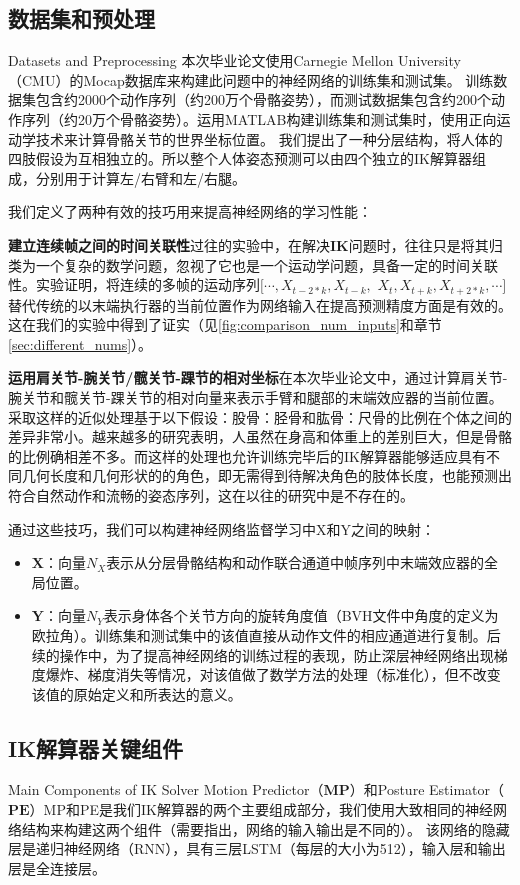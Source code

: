 \subsection{数据集和预处理}{Datasets and Preprocessing}
本次毕业论文使用Carnegie Mellon University（CMU）的Mocap数据库来构建此问题中的神经网络的训练集和测试集。 训练数据集包含约2000个动作序列（约200万个骨骼姿势），而测试数据集包含约200个动作序列（约20万个骨骼姿势）。运用MATLAB构建训练集和测试集时，使用正向运动学技术来计算骨骼关节的世界坐标位置。 我们提出了一种分层结构，将人体的四肢假设为互相独立的。所以整个人体姿态预测可以由四个独立的IK解算器组成，分别用于计算左/右臂和左/右腿。

我们定义了两种有效的技巧用来提高神经网络的学习性能：

\textbf{建立连续帧之间的时间关联性}过往的实验中，在解决\textbf{IK}问题时，往往只是将其归类为一个复杂的数学问题，忽视了它也是一个运动学问题，具备一定的时间关联性。实验证明，将连续的多帧的运动序列$[\cdots, X_{t-2*k}, X_{t-k},$ $ X_{t}, X_{t+k}, X_{t+2*k},\cdots]$替代传统的以末端执行器的当前位置作为网络输入在提高预测精度方面是有效的。 这在我们的实验中得到了证实（见\cref{fig:comparison_num_inputs}和章节\ref{sec:different_nums}）。

\textbf{运用肩关节-腕关节/髋关节-踝节的相对坐标}在本次毕业论文中，通过计算肩关节-腕关节和髋关节-踝关节的相对向量来表示手臂和腿部的末端效应器的当前位置。采取这样的近似处理基于以下假设：股骨：胫骨和肱骨：尺骨的比例在个体之间的差异非常小。越来越多的研究表明，人虽然在身高和体重上的差别巨大，但是骨骼的比例确相差不多。而这样的处理也允许训练完毕后的IK解算器能够适应具有不同几何长度和几何形状的的角色，即无需得到待解决角色的肢体长度，也能预测出符合自然动作和流畅的姿态序列，这在以往的研究中是不存在的。

通过这些技巧，我们可以构建神经网络监督学习中\*X和\*Y之间的映射：

\begin{itemize}
\item $\mathbf{X}$：向量$N_X$表示从分层骨骼结构和动作联合通道中帧序列中末端效应器的全局位置。
\item $\mathbf{Y}$：向量$N_Y$表示身体各个关节方向的旋转角度值（BVH文件中角度的定义为欧拉角）。训练集和测试集中的该值直接从动作文件的相应通道进行复制。后续的操作中，为了提高神经网络的训练过程的表现，防止深层神经网络出现梯度爆炸、梯度消失等情况，对该值做了数学方法的处理（标准化），但不改变该值的原始定义和所表达的意义。
\end{itemize}

\subsection{IK解算器关键组件}{Main Components of IK Solver}
\label{sec:components}
Motion Predictor（$\mathbf{MP}$）和Posture Estimator（$\mathbf{PE}$）MP和PE是我们IK解算器的两个主要组成部分，我们使用大致相同的神经网络结构来构建这两个组件（需要指出，网络的输入输出是不同的）。 该网络的隐藏层是递归神经网络（RNN），具有三层LSTM（每层的大小为512），输入层和输出层是全连接层。

